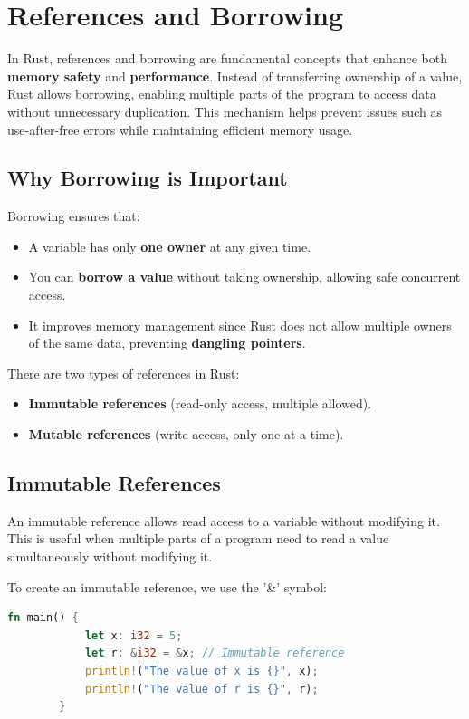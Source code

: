 \documentclass[a4paper,12pt]{report}
\begin{document}
	
	
	\section{References and Borrowing}\label{borr}
	
	In Rust, references and borrowing are fundamental concepts that enhance both \textbf{memory safety} and \textbf{performance}. Instead of transferring ownership of a value, Rust allows borrowing, enabling multiple parts of the program to access data without unnecessary duplication. This mechanism helps prevent issues such as use-after-free errors while maintaining efficient memory usage.
	
	\subsection*{Why Borrowing is Important}
	Borrowing ensures that:
	\begin{itemize}
		\item A variable has only \textbf{one owner} at any given time.
		\item You can \textbf{borrow a value} without taking ownership, allowing safe concurrent access.
		\item It improves memory management since Rust does not allow multiple owners of the same data, preventing \textbf{dangling pointers}.
	\end{itemize}
	
	There are two types of references in Rust:
	\begin{itemize}
		\item \textbf{Immutable references} (read-only access, multiple allowed).
		\item \textbf{Mutable references} (write access, only one at a time).
	\end{itemize}
	
	 \subsection*{Immutable References}
	An immutable reference allows read access to a variable without modifying it. This is useful when multiple parts of a program need to read a value simultaneously without modifying it.
	
	\noindent To create an immutable reference, we use the '\&' symbol:
	
	\begin{lstlisting}[language=Rust]
		fn main() {
			let x: i32 = 5;
			let r: &i32 = &x; // Immutable reference
			println!("The value of x is {}", x);
			println!("The value of r is {}", r);
		}
	\end{lstlisting}
	
\end{document}
